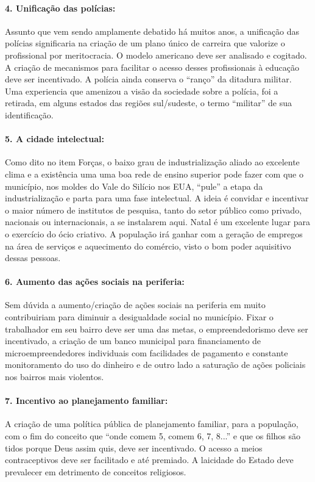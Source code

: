 \documentclass[
	12pt,				%
	openright,			%
	twoside,			%
	a4paper,			%
	chapter=TITLE,		%
	section=TITLE,		%
	subsection=TITLE,	%
	subsubsection=TITLE,%
	spanish,            %
	english,			%
	brazil				%
	]{abntex2}
\begin{document}
\paragraph*{\textbf{4. Unificação das polícias:}} Assunto que vem sendo amplamente debatido há muitos anos, a unificação das polícias significaria na criação de um plano único de carreira que valorize o profissional por meritocracia. O modelo americano deve ser analisado e cogitado. A criação de mecanismos para facilitar o acesso desses profissionais à educação deve ser incentivado. A polícia ainda conserva o “ranço” da ditadura militar. Uma experiencia que amenizou a visão da sociedade sobre a polícia, foi a retirada, em alguns estados das regiões sul/sudeste, o termo “militar” de sua identificação.
\hypertarget{O5}{}
\paragraph*{\textbf{5. A cidade intelectual:}} Como dito no item Forças, o baixo grau de industrialização aliado ao excelente clima e a existência uma uma boa rede de ensino superior pode fazer com que o município, nos moldes do Vale do Silício nos EUA, “pule” a etapa da industrialização e parta para uma fase intelectual. A ideia é convidar e incentivar o maior número de institutos de pesquisa, tanto do setor público como privado, nacionais ou internacionais, a se instalarem aqui. Natal é um excelente lugar para o exercício do ócio criativo. A população irá ganhar com a geração de empregos na área de serviços e aquecimento do comércio, visto o bom poder aquisitivo dessas pessoas.
\hypertarget{O6}{}
\paragraph*{\textbf{6. Aumento das ações sociais na periferia:}} Sem dúvida a aumento/criação de ações sociais na periferia em muito contribuiriam para diminuir a desigualdade social no município. Fixar o trabalhador em seu bairro deve ser uma das metas, o empreendedorismo deve ser incentivado, a criação de um banco municipal para financiamento de microempreendedores individuais com facilidades de pagamento e constante monitoramento do uso do dinheiro e de outro lado a saturação de ações policiais nos bairros mais violentos.
\hypertarget{O7}{}
\paragraph*{\textbf{7. Incentivo ao planejamento familiar:}} A criação de uma política pública de planejamento familiar, para a população, com o fim do conceito que “onde comem 5, comem 6, 7, 8...” e que os filhos são tidos porque Deus assim quis, deve ser incentivado. O acesso a meios contraceptivos deve ser facilitado e até premiado. A laicidade do Estado deve prevalecer em detrimento de conceitos religiosos.
\hypertarget{O8}{}
\end{document}
